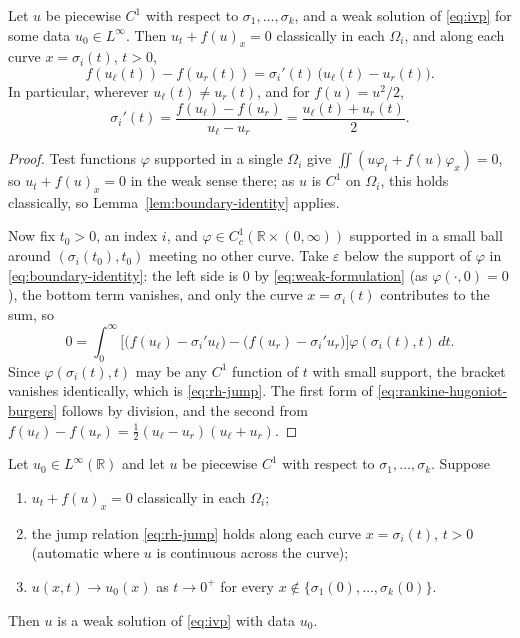 \begin{theorem}
\label{thm:rankine-hugoniot}
Let $u$ be piecewise $C^1$ with respect to $\sigma_1,\dots,\sigma_k$, and a weak
solution of \eqref{eq:ivp} for some data $u_0\in L^\infty$. Then $u_t+f(u)_x=0$
classically in each $\Omega_i$, and along each curve $x=\sigma_i(t)$, $t>0$,
\begin{equation}
  \label{eq:rh-jump}
  f(u_\ell(t)) - f(u_r(t)) = \sigma_i'(t)\,\big(u_\ell(t)-u_r(t)\big).
\end{equation}
In particular, wherever $u_\ell(t)\neq u_r(t)$, and for $f(u)=u^2/2$,
\begin{equation}
  \label{eq:rankine-hugoniot-burgers}
  \sigma_i'(t) = \frac{f(u_\ell) - f(u_r)}{u_\ell - u_r} = \frac{u_\ell(t) + u_r(t)}{2}.
\end{equation}
\end{theorem}

\begin{proof}
Test functions $\varphi$ supported in a single $\Omega_i$ give
$\iint (u\varphi_t+f(u)\varphi_x)=0$, so $u_t+f(u)_x=0$ in the weak sense
there; as $u$ is $C^1$ on $\Omega_i$, this holds classically, so
Lemma~\ref{lem:boundary-identity} applies.

Now fix $t_0>0$, an index $i$, and $\varphi\in C_c^1(\mathbb{R}\times
(0,\infty))$ supported in a small ball around $(\sigma_i(t_0),t_0)$ meeting no
other curve. Take $\varepsilon$ below the support of $\varphi$ in
\eqref{eq:boundary-identity}: the left side is $0$ by
\eqref{eq:weak-formulation} (as $\varphi(\cdot,0)=0$), the bottom term
vanishes, and only the curve $x=\sigma_i(t)$ contributes to the sum, so
\begin{equation*}
  0=\int_0^\infty\Big[\big(f(u_\ell)-\sigma_i'u_\ell\big)
    -\big(f(u_r)-\sigma_i'u_r\big)\Big]\varphi(\sigma_i(t),t)\,dt .
\end{equation*}
Since $\varphi(\sigma_i(t),t)$ may be any $C^1$ function of $t$ with small
support, the bracket vanishes identically, which is \eqref{eq:rh-jump}.
The first form of \eqref{eq:rankine-hugoniot-burgers} follows by division, and
the second from $f(u_\ell)-f(u_r)=\tfrac12(u_\ell-u_r)(u_\ell+u_r)$.
\end{proof}

\begin{proposition}
\label{prop:piecewise-weak}
Let $u_0\in L^\infty(\mathbb{R})$ and let $u$ be piecewise $C^1$ with
respect to $\sigma_1,\dots,\sigma_k$. Suppose
\begin{enumerate}
  \item[\textup{(i)}] $u_t+f(u)_x=0$ classically in each $\Omega_i$;
  \item[\textup{(ii)}] the jump relation \eqref{eq:rh-jump} holds along
    each curve $x=\sigma_i(t)$, $t>0$ (automatic where $u$ is continuous
    across the curve);
  \item[\textup{(iii)}] $u(x,t)\to u_0(x)$ as
    $t\to0^+$ for every $x\notin\{\sigma_1(0),\dots,\sigma_k(0)\}$.
\end{enumerate}
Then $u$ is a weak solution of \eqref{eq:ivp} with data $u_0$.
\end{proposition}

